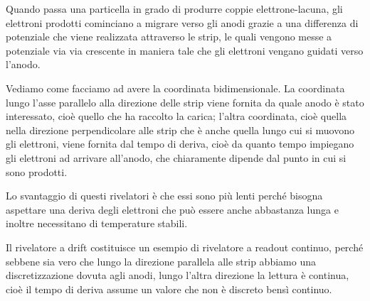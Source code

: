 Quando passa una particella in grado di produrre coppie elettrone-lacuna, gli elettroni prodotti cominciano a migrare verso gli anodi grazie a una differenza di potenziale che viene realizzata attraverso le strip, le quali vengono messe a potenziale via via crescente in maniera tale che gli elettroni vengano guidati verso l'anodo.

Vediamo come facciamo ad avere la coordinata bidimensionale. La coordinata lungo l'asse parallelo alla direzione delle strip viene fornita da quale anodo è stato interessato, cioè quello che ha raccolto la carica; l'altra coordinata, cioè quella nella direzione perpendicolare alle strip che è anche quella lungo cui si muovono gli elettroni, viene fornita dal tempo di deriva, cioè da quanto tempo impiegano gli elettroni ad arrivare all'anodo, che chiaramente dipende dal punto in cui si sono prodotti. 

Lo svantaggio di questi rivelatori è che essi sono più lenti perché bisogna aspettare una deriva degli elettroni che può essere anche abbastanza lunga e inoltre necessitano di temperature stabili.

Il rivelatore a drift costituisce un esempio di rivelatore a readout continuo, perché sebbene sia vero che lungo la direzione parallela alle strip abbiamo una discretizzazione dovuta agli anodi, lungo l'altra direzione la lettura è continua, cioè il tempo di deriva assume un valore che non è discreto bensì continuo.

